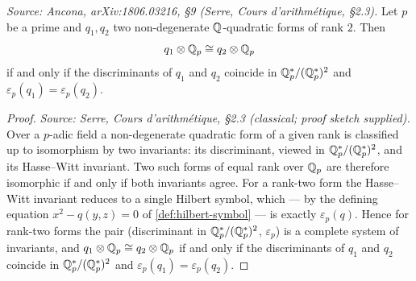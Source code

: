 \begin{proposition}
  \label{prop:local-invariant}
  \textit{Source: Ancona, arXiv:1806.03216, §9 (Serre, \emph{Cours d'arithmétique}, §2.3).}
  Let \(p\) be a prime and \(q_1, q_2\) two non-degenerate \(\mathbb{Q}\)-quadratic
  forms of rank \(2\). Then
  \[q_1 \otimes \mathbb{Q}_p \cong q_2 \otimes \mathbb{Q}_p\]
  if and only if the discriminants of \(q_1\) and \(q_2\) coincide in
  \(\mathbb{Q}_p^*/(\mathbb{Q}_p^*)^2\) and \(\varepsilon_p(q_1) = \varepsilon_p(q_2)\).
\end{proposition}

\begin{proof}
  \textit{Source: Serre, Cours d'arithmétique, §2.3 (classical; proof sketch
  supplied).}
  Over a \(p\)-adic field a non-degenerate quadratic form of a given rank is
  classified up to isomorphism by two invariants: its discriminant, viewed in
  \(\mathbb{Q}_p^*/(\mathbb{Q}_p^*)^2\), and its Hasse--Witt invariant. Two such forms of equal
  rank over \(\mathbb{Q}_p\) are therefore isomorphic if and only if both invariants
  agree. For a rank-two form the Hasse--Witt invariant reduces to a single
  Hilbert symbol, which — by the defining equation \(x^2 - q(y,z) = 0\) of
  \cref{def:hilbert-symbol} — is exactly \(\varepsilon_p(q)\). Hence for
  rank-two forms the pair (discriminant in \(\mathbb{Q}_p^*/(\mathbb{Q}_p^*)^2\),
  \(\varepsilon_p\)) is a complete system of invariants, and
  \(q_1 \otimes \mathbb{Q}_p \cong q_2 \otimes \mathbb{Q}_p\) if and only if the discriminants
  of \(q_1\) and \(q_2\) coincide in \(\mathbb{Q}_p^*/(\mathbb{Q}_p^*)^2\) and
  \(\varepsilon_p(q_1) = \varepsilon_p(q_2)\).
\end{proof}


